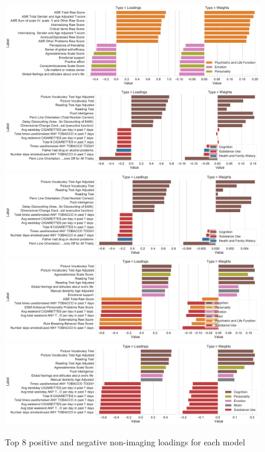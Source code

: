 \begin{figure}
\centering
\includegraphics[width=0.8\linewidth]{figures/regularization/hcp/PCA behaviour weights and loadings.pdf}
\includegraphics[width=0.8\linewidth]{figures/regularization/hcp/RCCA behaviour weights and loadings.pdf}
\includegraphics[width=0.8\linewidth]{figures/regularization/hcp/ElasticNet behaviour weights and loadings.pdf}
\includegraphics[width=0.8\linewidth]{figures/regularization/hcp/PLS behaviour weights and loadings.pdf}
\includegraphics[width=0.8\linewidth]{figures/regularization/hcp/SPLS behaviour weights and loadings.pdf}
\caption{Top 8 positive and negative non-imaging loadings for each model}
\label{fig:behaviour}
\end{figure}

